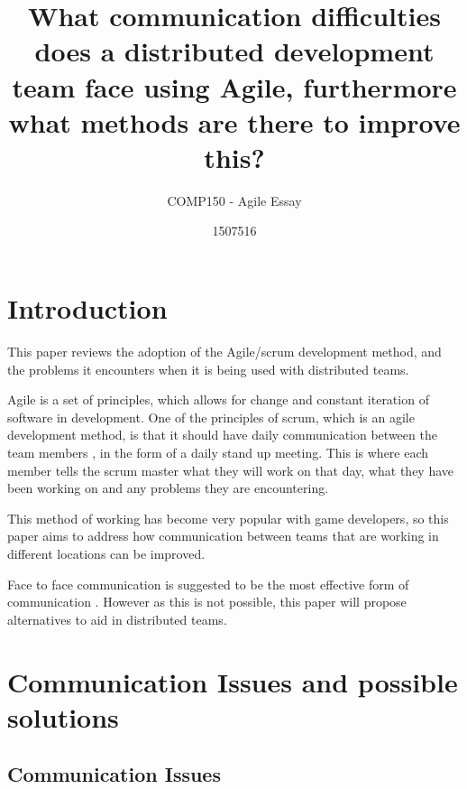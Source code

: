 \documentclass{scrartcl}
\title{What communication difficulties does a distributed development team face using Agile, furthermore what methods are there to improve this?}
\subtitle{COMP150 - Agile Essay}
\author{1507516}
\begin{document}
\maketitle


\section{Introduction}

This paper reviews the adoption of the Agile/scrum development method, and the problems it encounters when it is being used with distributed teams.

Agile is a set of principles, which allows for change and constant iteration of software in development. One of the principles of scrum, which is an agile development method, is that it should have daily communication between the team members \cite{abdullah2011}, in the form of a daily stand up meeting. This is where each member tells the scrum master what they will work on that day, what they have been working on and any problems they are encountering. 

This method of working has become very popular with game developers, so this paper aims to address how communication between teams that are working in different locations can be improved. 

Face to face communication is suggested to be the most effective form of communication \cite{joshi2013}. However as this is not possible, this paper will propose alternatives to aid in distributed teams.

\section{Communication Issues and possible solutions}







\subsection{Communication Issues}
\end{document}
